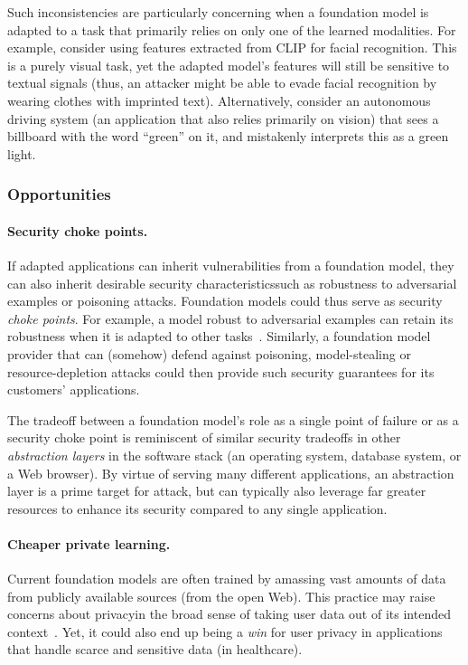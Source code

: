 Such inconsistencies are particularly concerning when a foundation model is adapted to a task that primarily relies on only one of the learned modalities. For example, consider using features extracted from CLIP for facial recognition. This is a purely visual task, yet the adapted model's features will still be sensitive to textual signals (thus, an attacker might be able to evade facial recognition by wearing clothes with imprinted text). 
Alternatively, consider an autonomous driving system (an application that also relies primarily on vision) that sees a billboard with the word ``green'' on it, and mistakenly interprets this as a green light.

\subsubsection{Opportunities}
\paragraph{Security choke points.}
If adapted applications can inherit vulnerabilities from a foundation model, they can also inherit desirable security characteristics\dash{}such as robustness to adversarial examples or poisoning attacks. Foundation models could thus serve as security \textit{choke points}.
For example, a model robust to adversarial examples can retain its robustness when it is adapted to other tasks~\citep{shafahi2019adversarially}. 
Similarly, a foundation model provider that can (somehow) defend against poisoning, model-stealing or resource-depletion attacks could then provide such security guarantees for its customers' applications.

The tradeoff between a foundation model's role as a single point of failure or as a security choke point is reminiscent of similar security tradeoffs in other \emph{abstraction layers} in the software stack (\eg an operating system, database system, or a Web browser). By virtue of serving many different applications, an abstraction layer is a prime target for attack, but can typically also leverage far greater resources to enhance its security compared to any single application.

\paragraph{Cheaper private learning.}
Current foundation models are often trained by amassing vast amounts of data from publicly available sources (\eg from the open Web). 
This practice may raise concerns about privacy\dash{}in the broad sense of taking user data out of its intended context~\citep{nissenbaum2004privacy, carlini2020extracting}. Yet, it could also end up being a \emph{win} for user privacy in applications that handle scarce and sensitive data (\eg in healthcare). 

